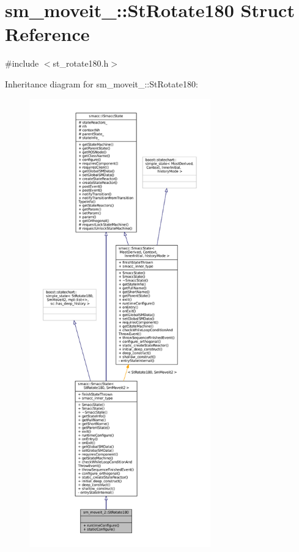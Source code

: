 \hypertarget{structsm__moveit__2_1_1StRotate180}{}\section{sm\+\_\+moveit\+\_\+:\+:St\+Rotate180 Struct Reference}
\label{structsm__moveit__2_1_1StRotate180}


{\ttfamily \#include $<$st\+\_\+rotate180.\+h$>$}



Inheritance diagram for sm\+\_\+moveit\+\_\+:\+:St\+Rotate180\+:
\nopagebreak
\begin{figure}[H]
\begin{center}
\leavevmode
\includegraphics[height=550pt]{structsm__moveit__2_1_1StRotate180__inherit__graph}
\end{center}
\end{figure}


